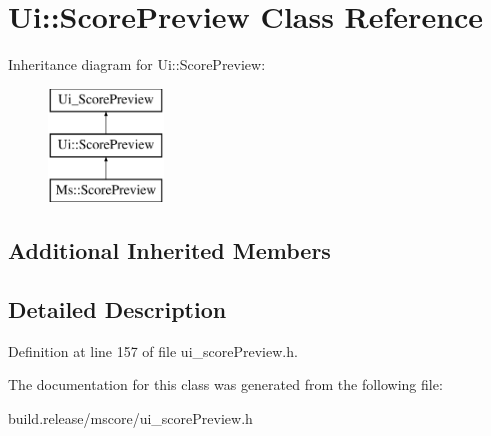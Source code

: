\hypertarget{class_ui_1_1_score_preview}{}\section{Ui\+:\+:Score\+Preview Class Reference}
\label{class_ui_1_1_score_preview}
Inheritance diagram for Ui\+:\+:Score\+Preview\+:\begin{figure}[H]
\begin{center}
\leavevmode
\includegraphics[height=3.000000cm]{class_ui_1_1_score_preview}
\end{center}
\end{figure}
\subsection*{Additional Inherited Members}


\subsection{Detailed Description}


Definition at line 157 of file ui\+\_\+score\+Preview.\+h.



The documentation for this class was generated from the following file\+:\begin{DoxyCompactItemize}
\item 
build.\+release/mscore/ui\+\_\+score\+Preview.\+h\end{DoxyCompactItemize}
